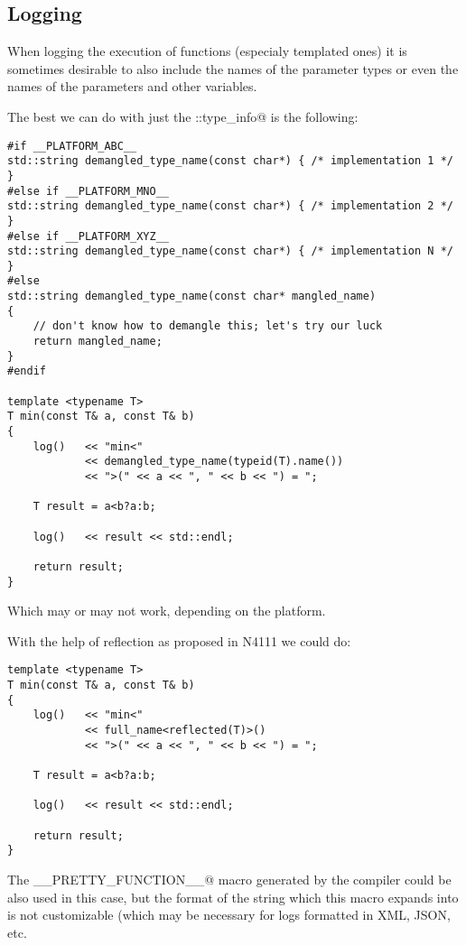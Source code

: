 \subsection{Logging}

When logging the execution of functions (especialy templated ones) it is sometimes
desirable to also include the names of the parameter types or even the names of the parameters
and other variables.

The best we can do with just the \verb@std::type_info@ is the following:

\begin{verbatim}
#if __PLATFORM_ABC__
std::string demangled_type_name(const char*) { /* implementation 1 */ }
#else if __PLATFORM_MNO__
std::string demangled_type_name(const char*) { /* implementation 2 */ }
#else if __PLATFORM_XYZ__
std::string demangled_type_name(const char*) { /* implementation N */ }
#else
std::string demangled_type_name(const char* mangled_name)
{
	// don't know how to demangle this; let's try our luck
	return mangled_name;
}
#endif

template <typename T>
T min(const T& a, const T& b)
{
	log()   << "min<"
	        << demangled_type_name(typeid(T).name())
	        << ">(" << a << ", " << b << ") = ";

	T result = a<b?a:b;

	log()   << result << std::endl;

	return result;
}

\end{verbatim}

Which may or may not work, depending on the platform.

With the help of reflection as proposed in N4111 we could do:

\begin{verbatim}
template <typename T>
T min(const T& a, const T& b)
{
	log()   << "min<"
	        << full_name<reflected(T)>()
	        << ">(" << a << ", " << b << ") = ";

	T result = a<b?a:b;

	log()   << result << std::endl;

	return result;
}
\end{verbatim}

The \verb@__PRETTY_FUNCTION__@ macro generated by the compiler could be also
used in this case, but the format of the string which this macro expands into is not customizable
(which may be necessary for logs formatted in XML, JSON, etc.

